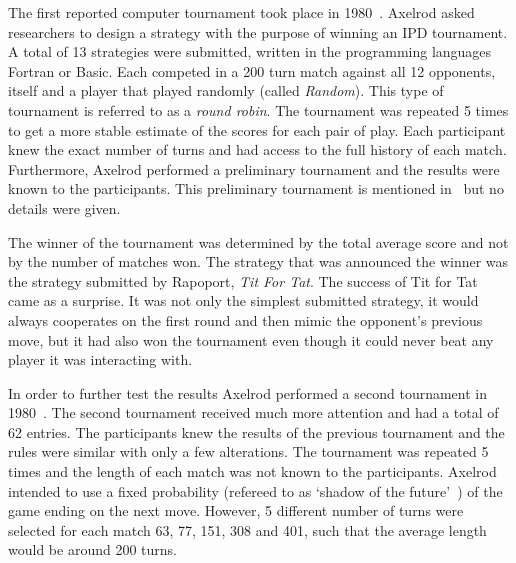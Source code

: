 
The first reported computer tournament took place in 1980~\cite{Axelrod1980a}. 
Axelrod asked researchers to design a strategy with the purpose of winning an IPD
tournament. A
total of 13 strategies were submitted, written in the programming languages
Fortran or Basic. Each competed in a 200 turn match against all 12 opponents,
itself and a player that played randomly (called \textit{Random}). This type of
tournament is referred to as a \textit{round robin}. The tournament was repeated 5 times
to get a more stable estimate of the scores for each pair of play.
Each participant knew the exact number of turns and had access to the full
history of each match. Furthermore, Axelrod performed a preliminary tournament
and the results were known to the participants. This preliminary tournament is
mentioned in~\cite{Axelrod1980a} but no details were given.

The winner of the tournament was determined by the total average score and not
by the number of matches won. The strategy that was announced the winner was the
strategy submitted by Rapoport, \textit{Tit For Tat}. The success of Tit for Tat
came as a surprise. It was not only the simplest submitted strategy, it would
always cooperates on the first round and then mimic the opponent's previous
move, but it had also won the tournament even though it could never beat
any player it was interacting with.

In order to further test the results Axelrod performed a second tournament
in 1980~\cite{Axelrod1980b}. The second tournament received much more attention
and had a total of 62 entries. The participants knew the results of the previous
tournament and the rules were similar with only a few alterations. The
tournament was repeated 5 times and the length of each match was not known to
the participants. Axelrod intended to use a fixed probability (refereed to as
`shadow of the future'~\cite{Axelrod1988}) of the game ending on the next move.
However, 5 different number of turns were selected for each match 63, 77, 151,
308 and 401, such that the average length would be around 200 turns.

